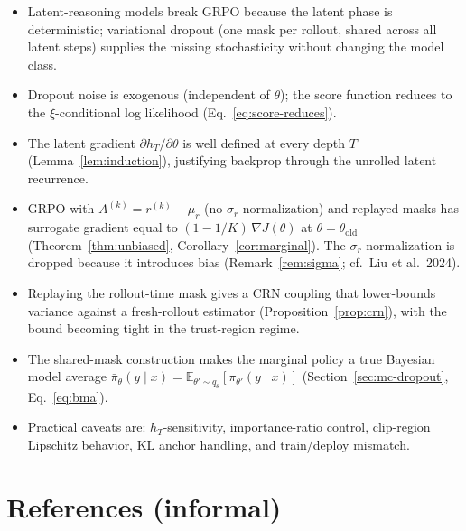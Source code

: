 \documentclass[11pt]{article}
\theoremstyle{definition}
\theoremstyle{remark}
\newcommand{\E}{\mathbb{E}}
\newcommand{\old}{\mathrm{old}}
\begin{document}
\begin{itemize}[topsep=2pt,itemsep=2pt]
\item Latent-reasoning models break GRPO because the latent phase is
      deterministic; variational dropout (one mask per rollout, shared
      across all latent steps) supplies the missing stochasticity without
      changing the model class.
\item Dropout noise is exogenous (independent of $\theta$); the score
      function reduces to the $\xi$-conditional log likelihood
      (Eq.~\ref{eq:score-reduces}).
\item The latent gradient $\partial h_T/\partial \theta$ is well defined
      at every depth $T$ (Lemma~\ref{lem:induction}), justifying
      backprop through the unrolled latent recurrence.
\item GRPO with $A^{(k)} = r^{(k)} - \mu_r$ (no $\sigma_r$ normalization)
      and replayed masks has surrogate gradient equal to
      $(1 - 1/K)\,\nabla J(\theta)$ at $\theta = \theta_\old$
      (Theorem~\ref{thm:unbiased}, Corollary~\ref{cor:marginal}).  The
      $\sigma_r$ normalization is dropped because it introduces bias
      (Remark~\ref{rem:sigma}; cf.\ Liu et al.\ 2024).
\item Replaying the rollout-time mask gives a CRN coupling that
      lower-bounds variance against a fresh-rollout estimator
      (Proposition~\ref{prop:crn}), with the bound becoming tight in the
      trust-region regime.
\item The shared-mask construction makes the marginal policy a true
      Bayesian model average $\bar\pi_\theta(y\mid x)
        = \E_{\theta'\sim q_\theta}[\pi_{\theta'}(y\mid x)]$
      (Section~\ref{sec:mc-dropout}, Eq.~\ref{eq:bma}).
\item Practical caveats are: $h_T$-sensitivity, importance-ratio control,
      clip-region Lipschitz behavior, KL anchor handling, and
      train/deploy mismatch.
\end{itemize}

\section*{References (informal)}
\end{document}
